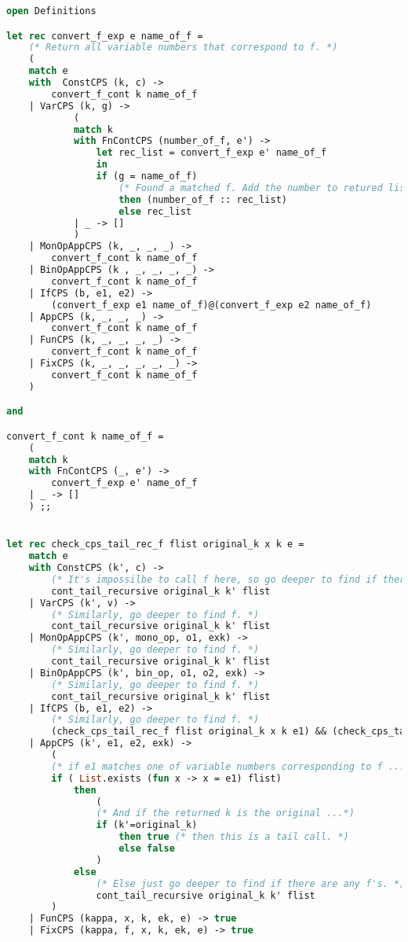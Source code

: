 \begin{lstlisting}[language=Caml, caption=checlTailRecCPS.ml]
open Definitions

let rec convert_f_exp e name_of_f = 
    (* Return all variable numbers that correspond to f. *)
    (
    match e
    with  ConstCPS (k, c) -> 
        convert_f_cont k name_of_f
    | VarCPS (k, g) -> 
            (
            match k 
            with FnContCPS (number_of_f, e') -> 
                let rec_list = convert_f_exp e' name_of_f 
                in 
                if (g = name_of_f) 
                    (* Found a matched f. Add the number to retured list. *)
                    then (number_of_f :: rec_list) 
                    else rec_list
            | _ -> []
            )
    | MonOpAppCPS (k, _, _, _) -> 
        convert_f_cont k name_of_f
    | BinOpAppCPS (k , _, _, _, _) -> 
        convert_f_cont k name_of_f
    | IfCPS (b, e1, e2) ->
        (convert_f_exp e1 name_of_f)@(convert_f_exp e2 name_of_f)
    | AppCPS (k, _, _, _) ->
        convert_f_cont k name_of_f
    | FunCPS (k, _, _, _, _) ->
        convert_f_cont k name_of_f
    | FixCPS (k, _, _, _, _, _) ->
        convert_f_cont k name_of_f
    )

and 

convert_f_cont k name_of_f =
    (
    match k
    with FnContCPS (_, e') -> 
        convert_f_exp e' name_of_f
    | _ -> []
    ) ;;


let rec check_cps_tail_rec_f flist original_k x k e = 
    match e
    with ConstCPS (k', c) -> 
        (* It's impossilbe to call f here, so go deeper to find if there are any f's. *)
        cont_tail_recursive original_k k' flist
    | VarCPS (k', v) -> 
        (* Similarly, go deeper to find f. *)
        cont_tail_recursive original_k k' flist
    | MonOpAppCPS (k', mono_op, o1, exk) ->
        (* Similarly, go deeper to find f. *)
        cont_tail_recursive original_k k' flist
    | BinOpAppCPS (k', bin_op, o1, o2, exk) -> 
        (* Similarly, go deeper to find f. *)
        cont_tail_recursive original_k k' flist
    | IfCPS (b, e1, e2) -> 
        (* Similarly, go deeper to find f. *)
        (check_cps_tail_rec_f flist original_k x k e1) && (check_cps_tail_rec_f flist original_k x k e2)
    | AppCPS (k', e1, e2, exk) -> 
        (
        (* if e1 matches one of variable numbers corresponding to f ... *)
        if ( List.exists (fun x -> x = e1) flist)
            then 
                (
                (* And if the returned k is the original ...*)
                if (k'=original_k) 
                    then true (* then this is a tail call. *)
                    else false
                )
            else
                (* Else just go deeper to find if there are any f's. *)
                cont_tail_recursive original_k k' flist
        )
    | FunCPS (kappa, x, k, ek, e) -> true
    | FixCPS (kappa, f, x, k, ek, e) -> true


\end{lstlisting}
